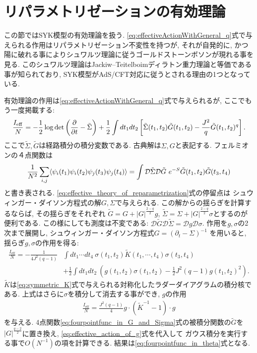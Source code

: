 \section{リパラメトリゼーションの有効理論 \label{sec:effective_theory}}
この節ではSYK模型の有効理論を扱う. 
\eqref{eq:effectiveActionWithGeneral_q}式で与えられる作用はリパラメトリゼーション不変性を持つが, 
それが自発的に, かつ陽に破れる事によりシュワルツ理論に従うゴールドストーンボソンが現れる事を見る. 
このシュワルツ理論はJackiw--Teitelboimディラトン重力理論と等価である事が知られており, 
SYK模型がAdS/CFT対応に従うとされる理由の1つとなっている. 

有効理論の作用は\eqref{eq:effectiveActionWithGeneral_q}式で与えられるが, 
ここでもう一度掲載する:
\begin{align}
	\frac{I_{\mathrm{eff}}}{N}
	= -\frac{1}{2}\log\det\left(\frac{\partial}{\partial t} - \tilde{\Sigma}\right)
		+ \frac{1}{2}\int dt_1dt_2
		\left[
			\tilde{\Sigma}(t_1, t_2)\tilde{G}(t_1, t_2)
			- \frac{J^2}{q}\tilde{G}(t_1, t_2)^q
		\right].
	\label{eq:effective_theory_of_reparametrization}
\end{align}
ここで$\tilde{\Sigma},\tilde{G}$は経路積分の積分変数である. 
古典解は$\Sigma, G$と表記する. 
フェルミオンの４点関数は
\begin{align}
	\frac{1}{N^2}\sum_{i,j}\average{\psi_i(t_1)\psi_i(t_2)\psi_j(t_3)\psi_j(t_4)}
	= \int \mathcal{D}\tilde{\Sigma}\mathcal{D}\tilde{G}\ 
		e^{-S}\tilde{G}(t_1, t_2)\tilde{G}(t_3, t_4)
	\label{eq:fourpointfunc_in_G_and_Sigma}
\end{align}
と書き表される. 
\eqref{eq:effective_theory_of_reparametrization}式の停留点は
シュウィンガー・ダイソン方程式の解$G,\Sigma$で与えられる. 
この解からの揺らぎを計算するならば, その揺らぎをそれぞれ
$\tilde{G} = G + |G|^{\frac{2-q}{2}}g$, 
$\tilde{\Sigma} = \Sigma + |G|^{\frac{2-q}{2}}\sigma$とするのが便利である. 
この様にしても測度は不変である: 
$\mathcal{D}\tilde{G}\mathcal{D}\tilde{\Sigma} = \mathcal{D}g\mathcal{D}\sigma$. 
作用を$g,\sigma$の2次まで展開し, シュウィンガー・ダイソン方程式$G = (\partial_t - \Sigma)^{-1}$
を用いると, 揺らぎ$g,\sigma$の作用を得る:
\begin{align}
	\frac{I_{\mathrm{eff}}}{N}
		= -\frac{1}{4J^2(q-1)}&\int dt_1\cdots dt_4\ 
			\sigma(t_1, t_2)\tilde{K}(t_1, \cdots, t_4)\sigma(t_3, t_4)\nonumber\\
		&+ \frac{1}{2}\int dt_1dt_2\ 
		\left(
			g(t_1, t_2)\sigma(t_1, t_2) - \frac{1}{2}J^2(q-1)g(t_1, t_2)^2
		\right).
\end{align}
$\tilde{K}$は\eqref{eq:symmetric_K}式で与えられる対称化したラダーダイアグラムの積分核である. 
上式はさらに$\sigma$を積分して消去する事ができ, $g$の作用
\begin{align}
	\frac{I_{\mathrm{eff}}}{N} = \frac{J^2(q-1)}{4}g\cdot(\tilde{K}^{-1} - 1)\cdot g
	\label{eq:effective_action_of_g}
\end{align}
を与える. 
4点関数\eqref{eq:fourpointfunc_in_G_and_Sigma}式の被積分関数の$\tilde{G}$を
$|G|^{\frac{q-2}{2}}$に置き換え, \eqref{eq:effective_action_of_g}式を代入して
ガウス積分を実行する事で$O(N^{-1})$の項を計算できる. 
結果は\eqref{eq:fourpointfunc_in_theta}式となる. 

